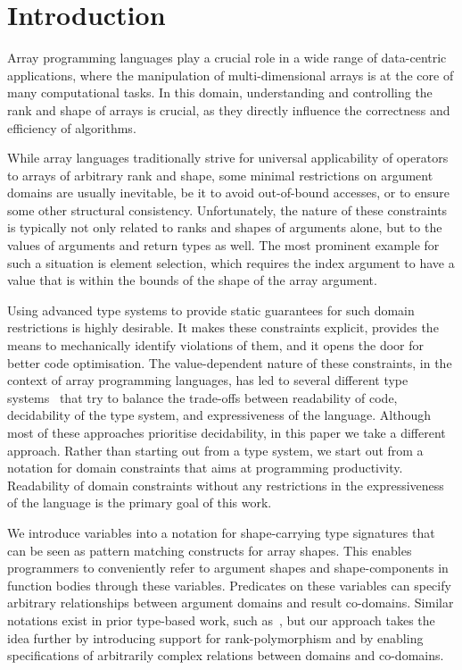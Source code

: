 \section{Introduction}

Array programming languages play a crucial role in a wide range of data-centric applications, where the manipulation of multi-dimen\-sional arrays is at the core of many computational tasks.
In this domain, understanding and controlling the rank and shape of arrays is crucial, as they directly influence the correctness and efficiency of algorithms.

While array languages traditionally strive for universal applicability of operators to arrays of arbitrary rank and shape, some minimal restrictions on argument domains are usually inevitable, be it to avoid out-of-bound accesses, or to ensure some other structural consistency.
Unfortunately, the nature of these constraints is typically not only related to ranks and shapes of arguments alone, but to the values of arguments and return types as well.
The most prominent example for such a situation is element selection, which requires the index argument to have a value that is within the bounds of the shape of the array argument.

Using advanced type systems to provide static guarantees for such domain restrictions is highly desirable.
It makes these constraints explicit, provides the means to mechanically identify violations of them, and it opens the door for better code optimisation.
The value-dependent nature of these constraints, in the context of array programming languages, has led to several different type systems~\cite{indexed, cube, dependent-types, futhark-size-parameters, remora} that try to balance the trade-offs between readability of code, decidability of the type system, and expressiveness of the language.
Although most of these approaches prioritise decidability, in this paper we take a different approach.
Rather than starting out from a type system, we start out from a notation for domain constraints that aims at programming productivity.
Readability of domain constraints without any restrictions in the expressiveness of the language is the primary goal of this work.

We introduce variables into a notation for shape-carrying type signatures that can be seen as pattern matching constructs for array shapes.
This enables programmers to conveniently refer to argument shapes and shape-components in function bodies through these variables.
Predicates on these variables can specify arbitrary relationships between argument domains and result co-domains.
Similar notations exist in prior type-based work, such as~\cite{dependent-types, futhark-size-parameters}, but our approach takes the idea further by introducing support for rank-polymorphism and by enabling specifications of arbitrarily complex relations between domains and co-domains.

